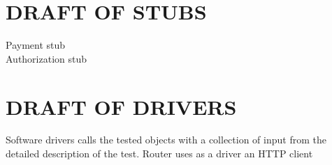 \section{DRAFT OF STUBS}
Payment stub \\
Authorization stub \\

\section{DRAFT OF DRIVERS}
Software drivers calls the tested objects with a collection of input from the detailed description of the test.
Router uses as a driver an HTTP client

